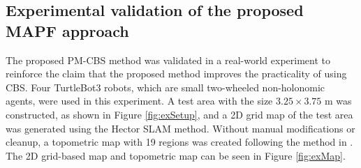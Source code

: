 \documentclass[letterpaper, 10 pt, conference]{ieeeconf}  %
\begin{document}
\subsection{Experimental validation of the proposed MAPF approach}
The proposed PM-CBS method was validated in a real-world experiment to reinforce the claim that the proposed method improves the practicality of using  CBS. Four TurtleBot3 robots, which are small two-wheeled non-holonomic agents, were used in this experiment. A  test area with the size $3.25 \times 3.75$ m was constructed, as shown in Figure \ref{fig:exSetup}, and a 2D grid map of the test area was generated using the Hector SLAM \cite{Hector2011} method. Without manual modifications or cleanup, a topometric map with 19 regions was created following the method in \cite{FREDRIKSSON_SEMANTIC_MAPPING}. The 2D grid-based map and topometric map can be seen in Figure \ref{fig:exMap}.
\end{document}
